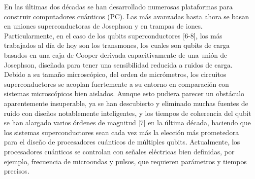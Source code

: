 










En las últimas dos décadas se han desarrollado numerosas plataformas para construir computadores cuánticos (PC). Las más avanzadas hasta ahora se basan en uniones superconductoras de Josephson y en trampas de iones. Particularmente, en el caso de los qubits superconductores [6-8], los más trabajados al día de hoy son los transmones, los cuales son qubits de carga basados en una caja de Cooper derivada capacitivamente de una unión de Josephson, diseñada para tener una sensibilidad reducida a ruidos de carga. Debido a su tamaño microscópico, del orden de micrómetros, los circuitos superconductores se acoplan fuertemente a su entorno en comparación con sistemas microscópicos bien aislados. Aunque esto pudiera parecer un obstáculo aparentemente insuperable, ya se han descubierto y eliminado muchas fuentes de ruido con diseños notablemente inteligentes, y los tiempos de coherencia del qubit se han alargado varios órdenes de magnitud [7] en la última década, haciendo que los sistemas superconductores sean cada vez más la elección más prometedora para el diseño de procesadores cuánticos de múltiples qubits. Actualmente, los procesadores cuánticos se controlan con señales eléctricas bien definidas, por ejemplo, frecuencia de microondas y pulsos, que requieren parámetros y tiempos precisos.

